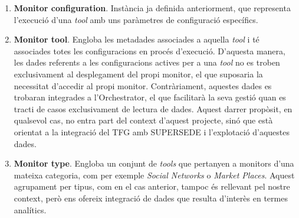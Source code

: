 \begin{enumerate}
\item \textbf{Monitor configuration}. Instància ja definida anteriorment, que representa l'execució d'una \textit{tool} amb uns paràmetres de configuració específics.
\item \textbf{Monitor tool}. Engloba les metadades associades a aquella \textit{tool} i té associades totes les configuracions en procés d'execució. D'aquesta manera, les dades referents a les configuracions actives per a una \textit{tool} no es troben exclusivament al desplegament del propi monitor, el que suposaria la necessitat d'accedir al propi monitor. Contràriament, aquestes dades es trobaran integrades a l'Orchestrator, el que facilitarà la seva gestió quan es tracti de casos exclusivament de lectura de dades. Aquest darrer propòsit, en qualsevol cas, no entra part del context d'aquest projecte, sinó que està orientat a la integració del TFG amb SUPERSEDE i l'explotació d'aquestes dades.
\item \textbf{Monitor type}. Engloba un conjunt de \textit{tools} que pertanyen a monitors d'una mateixa categoria, com per exemple \textit{Social Networks} o \textit{Market Places}. Aquest agrupament per tipus, com en el cas anterior, tampoc és rellevant pel nostre context, però ens ofereix integració de dades que resulta d'interès en termes analítics.
\end{enumerate}

